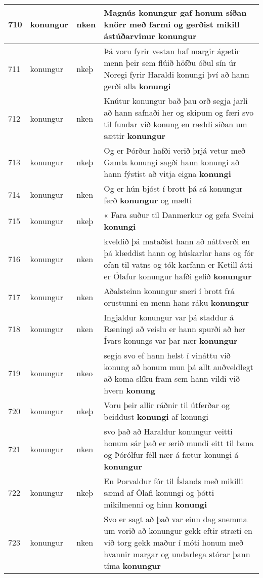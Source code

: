 \documentclass{article}
\begin{document}
\begin{longtable}{p{1cm}|p{1cm}|p{1cm}|p{13cm}}
\hline
710&konungur&nken&Magnús konungur gaf honum síðan knörr með farmi og gerðist mikill ástúðarvinur \textbf{konungur} \\
\hline
711&konungur&nkeþ&Þá voru fyrir vestan haf margir ágætir menn þeir sem flúið höfðu óðul sín úr Noregi fyrir Haraldi konungi því að hann gerði alla \textbf{konungi} \\
\hline
712&konungur&nken&Knútur konungur bað þau orð segja jarli að hann safnaði her og skipum og færi svo til fundar við konung en ræddi síðan um sættir \textbf{konungur} \\
\hline
713&konungur&nkeþ&Og er Þórður hafði verið þrjá vetur með Gamla konungi sagði hann konungi að hann fýstist að vitja eigna \textbf{konungi} \\
\hline
714&konungur&nken&Og er hún bjóst í brott þá sá konungur ferð \textbf{konungur} og mælti\\
\hline
715&konungur&nkeþ&« Fara suður til Danmerkur og gefa Sveini \textbf{konungi} \\
\hline
716&konungur&nken&kveldið þá mataðist hann að náttverði en þá klæddist hann og húskarlar hans og fór ofan til vatns og tók karfann er Ketill átti er Ólafur konungur hafði gefið \textbf{konungur} \\
\hline
717&konungur&nken&Aðalsteinn konungur sneri í brott frá orustunni en menn hans ráku \textbf{konungur} \\
\hline
718&konungur&nken&Ingjaldur konungur var þá staddur á Ræningi að veislu er hann spurði að her Ívars konungs var þar nær \textbf{konungur} \\
\hline
719&konungur&nkeo&segja svo ef hann helst í vináttu við konung að honum mun þá allt auðveldlegt að koma slíku fram sem hann vildi við hvern \textbf{konung} \\
\hline
720&konungur&nkeþ&Voru þeir allir ráðnir til útferðar og beiddust \textbf{konungi} af konungi\\
\hline
721&konungur&nken&svo það að Haraldur konungur veitti honum sár það er ærið mundi eitt til bana og Þórólfur féll nær á fætur konungi á \textbf{konungur} \\
\hline
722&konungur&nkeþ&En Þorvaldur fór til Íslands með mikilli sæmd af Ólafi konungi og þótti mikilmenni og hinn \textbf{konungi} \\
\hline
723&konungur&nken&Svo er sagt að það var einn dag snemma um vorið að konungur gekk eftir stræti en við torg gekk maður í móti honum með hvannir margar og undarlega stórar þann tíma \textbf{konungur} \\

\end{longtable}
\end{document}
